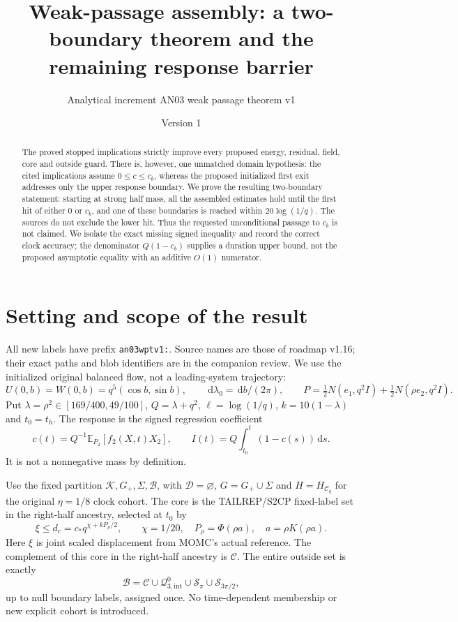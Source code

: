 \documentclass[11pt]{article}
\title{Weak-passage assembly: a two-boundary theorem and the remaining response barrier}
\author{Analytical increment AN03 weak passage theorem v1}
\date{Version 1}
\theoremstyle{remark}\newtheorem{remark}[theorem]{Remark}
\newcommand{\dd}{\,\mathrm d}
\newcommand{\E}{\mathbb E}
\newcommand{\KK}{\mathcal K}
\newcommand{\BB}{\mathcal B}
\newcommand{\Gp}{G_+}
\begin{document}
\maketitle
\begin{abstract}
The proved stopped implications strictly improve every proposed
energy, residual, field, core and outside guard. There is, however,
one unmatched domain hypothesis: the cited implications assume
$0\le c\le c_b$, whereas the proposed initialized first exit
addresses only the upper response boundary. We prove the resulting
two-boundary statement: starting at strong half mass, all the
assembled estimates hold until the first hit of either $0$ or $c_b$,
and one of these boundaries is reached within $20\log(1/q)$.
The sources do not exclude the lower hit. Thus the requested
unconditional passage to $c_b$ is not claimed. We isolate the exact
missing signed inequality and record the correct clock accuracy;
the denominator $Q(1-c_b)$ supplies a duration upper bound, not
the proposed asymptotic equality with an additive $O(1)$ numerator.
\end{abstract}

\section{Setting and scope of the result}
All new labels have prefix \texttt{an03wptv1:}. Source names are
those of roadmap v1.16; their exact paths and blob identifiers are
in the companion review. We use the initialized original balanced
flow, not a leading-system trajectory:
\[
 U(0,b)=W(0,b)=q^5(\cos b,\sin b),\qquad
 \dd\lambda_0=\dd b/(2\pi),\qquad
 P=\tfrac12N(e_1,q^2I)+\tfrac12N(\rho e_2,q^2I).
\]
Put $\lambda=\rho^2\in[169/400,49/100]$, $Q=\lambda+q^2$,
$\ell=\log(1/q)$, $k=10(1-\lambda)$ and $t_0=t_h$.
The response is the signed regression coefficient
\begin{equation}
 c(t)=Q^{-1}\E_{P_2}[f_2(X,t)X_2],\qquad
 I(t)=Q\int_{t_0}^t(1-c(s))\dd s.
 \label{an03wptv1:response}
\end{equation}
It is not a nonnegative mass by definition.

Use the fixed partition $\KK,\Gp,\Sigma,\BB$, with
$\mathcal D=\varnothing$, $G=\Gp\cup\Sigma$ and
$H=H_{\mathcal C_q}$ for the original $\eta=1/8$ clock cohort.
The core is the TAILREP/S2CP fixed-label set in the right-half
ancestry, selected at $t_0$ by
\begin{equation}
 \xi\le d_c=c_*q^{\chi+kP_\rho/2},\qquad
 \chi=1/20,\quad P_\rho=\Phi(\rho a),\quad a=\rho K(\rho a).
 \label{an03wptv1:core}
\end{equation}
Here $\xi$ is joint scaled displacement from MOMC's actual reference.
The complement of this core in the right-half ancestry is
$\mathcal C$. The entire outside set is exactly
\begin{equation}
 \BB=\mathcal C\cup\mathcal Q_{3,\mathrm{int}}^0
              \cup\mathcal S_\pi\cup\mathcal S_{3\pi/2},
 \label{an03wptv1:outsidepartition}
\end{equation}
up to null boundary labels, assigned once. No time-dependent
membership or new explicit cohort is introduced.
\end{document}

